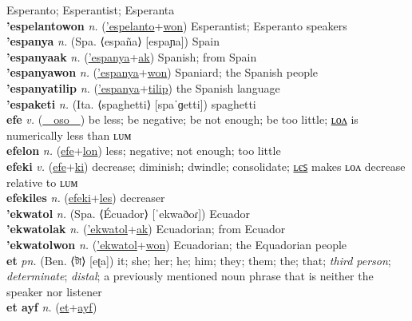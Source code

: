 Esperanto; Esperantist; Esperanta \label{'espelantoak} \\
\textbf{'espelantowon} \textit{n.} (\hyperref['espelanto]{'espelanto}+\hyperref[won]{won})
Esperantist; Esperanto speakers \label{'espelantowon} \\
\textbf{'espanya} \textit{n.} (Spa. ⟨españa⟩ [espaɲa])
Spain \label{'espanya} \\
\textbf{'espanyaak} \textit{n.} (\hyperref['espanya]{'espanya}+\hyperref[ak]{ak})
Spanish; from Spain \label{'espanyaak} \\
\textbf{'espanyawon} \textit{n.} (\hyperref['espanya]{'espanya}+\hyperref[won]{won})
Spaniard; the Spanish people \label{'espanyawon} \\
\textbf{'espanyatilip} \textit{n.} (\hyperref['espanya]{'espanya}+\hyperref[tilip]{tilip})
the Spanish language \label{'espanyatilip} \\
\textbf{'espaketi} \textit{n.} (Ita. ⟨spaghetti⟩ [spaˈɡetti])
spaghetti \label{'espaketi} \\
\textbf{efe} \textit{v.} (\hyperref[oso]{~~oso~~})
be less; be negative; be not enough; be too little; \hyperref[efelon]{ʟᴏᴧ} is numerically less than ʟᴜᴍ \label{efe} \\
\textbf{efelon} \textit{n.} (\hyperref[efe]{efe}+\hyperref[lon]{lon})
less; negative; not enough; too little \label{efelon} \\
\textbf{efeki} \textit{v.} (\hyperref[efe]{efe}+\hyperref[ki]{ki})
decrease; diminish; dwindle; consolidate; \hyperref[efekiles]{ʟєꜱ} makes ʟᴏᴧ decrease relative to ʟᴜᴍ \label{efeki} \\
\textbf{efekiles} \textit{n.} (\hyperref[efeki]{efeki}+\hyperref[les]{les})
decreaser \label{efekiles} \\
\textbf{'ekwatol} \textit{n.} (Spa. ⟨Écuador⟩ [ˈekwaðoɾ])
Ecuador \label{'ekwatol} \\
\textbf{'ekwatolak} \textit{n.} (\hyperref['ekwatol]{'ekwatol}+\hyperref[ak]{ak})
Ecuadorian; from Ecuador \label{'ekwatolak} \\
\textbf{'ekwatolwon} \textit{n.} (\hyperref['ekwatol]{'ekwatol}+\hyperref[won]{won})
Ecuadorian; the Equadorian people \label{'ekwatolwon} \\
\textbf{et} \textit{pn.} (Ben. ⟨টা⟩ [eʈa])
it; she; her; he; him; they; them; the; that; \textit{third person}; \textit{determinate}; \textit{distal}; a previously mentioned noun phrase that is neither the speaker nor listener \label{et} \\
\textbf{et ayf} \textit{n.} (\hyperref[et]{et}+\hyperref[yf]{ayf})
